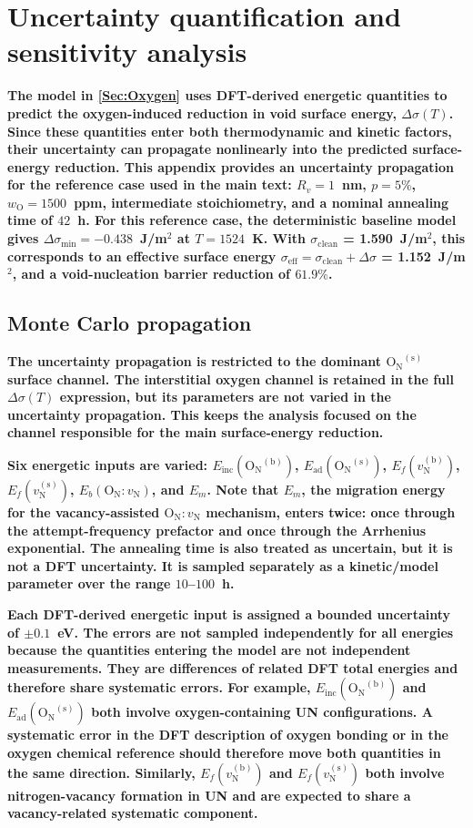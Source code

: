 \documentclass[preprint,12pt,sort&compress]{elsarticle}
\newcommand{\?}{\stackrel{?}{=}}
\providecommand{\DIFaddtex}[1]{{\bf #1}} %
\providecommand{\DIFadd}[1]{\texorpdfstring{\DIFaddtex{#1}}{#1}} %
\begin{document}
\section{\DIFadd{Uncertainty quantification and sensitivity analysis}}
\label{App:UQ}

\DIFadd{The model in \cref{Sec:Oxygen} uses DFT-derived energetic quantities to predict the oxygen-induced reduction in void surface energy, $\Delta\sigma(T)$. Since these quantities enter both thermodynamic and kinetic factors, their uncertainty can propagate nonlinearly into the predicted surface-energy reduction. This appendix provides an uncertainty propagation for the reference case used in the main text: $R_v=1$~nm, $p=5\%$, $w_\mathrm{O}=1500$~ppm, intermediate stoichiometry, and a nominal annealing time of $42$~h. For this reference case, the deterministic baseline model gives $\Delta\sigma_\mathrm{min}=-0.438$~J/m$^{2}$ at $T=1524$~K. With $\sigma_\mathrm{clean}$ = 1.590~J/m$^{2}$, this corresponds to an effective surface energy $\sigma_\mathrm{eff}=\sigma_\mathrm{clean}+\Delta\sigma$ = 1.152~J/m$^{2}$, and a void-nucleation barrier reduction of $61.9\%$.
}

\subsection{\DIFadd{Monte Carlo propagation}}

\DIFadd{The uncertainty propagation is restricted to the dominant $\mathrm{O_N}^{(\mathrm{s})}$ surface channel. The interstitial oxygen channel is retained in the full $\Delta\sigma(T)$ expression, but its parameters are not varied in the uncertainty propagation. This keeps the analysis focused on the channel responsible for the main surface-energy reduction.
}

\DIFadd{Six energetic inputs are varied: $E_\mathrm{inc}(\mathrm{O_N}^{(\mathrm{b})})$, $E_\mathrm{ad}(\mathrm{O_N}^{(\mathrm{s})})$, $E_f(v_\mathrm{N}^{(\mathrm{b})})$, $E_f(v_\mathrm{N}^{(\mathrm{s})})$, $E_b(\mathrm{O_N}:v_\mathrm{N})$, and $E_m$. Note that $E_m$, the migration energy for the vacancy-assisted $\mathrm{O_N}:v_\mathrm{N}$ mechanism, enters twice: once through the attempt-frequency prefactor and once through the Arrhenius exponential. The annealing time is also treated as uncertain, but it is not a DFT uncertainty. It is sampled separately as a kinetic/model parameter over the range $10$--$100$~h.
}

\DIFadd{Each DFT-derived energetic input is assigned a bounded uncertainty of $\pm0.1$~eV. The errors are not sampled independently for all energies because the quantities entering the model are not independent measurements. They are differences of related DFT total energies and therefore share systematic errors. For example, $E_\mathrm{inc}(\mathrm{O_N}^{(\mathrm{b})})$ and $E_\mathrm{ad}(\mathrm{O_N}^{(\mathrm{s})})$ both involve oxygen-containing UN configurations. A systematic error in the DFT description of oxygen bonding or in the oxygen chemical reference should therefore move both quantities in the same direction. Similarly, $E_f(v_\mathrm{N}^{(\mathrm{b})})$ and $E_f(v_\mathrm{N}^{(\mathrm{s})})$ both involve nitrogen-vacancy formation in UN and are expected to share a vacancy-related systematic component.
}
\end{document}
